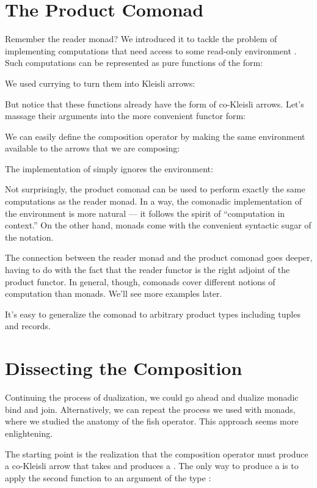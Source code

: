 \section{The Product Comonad}

Remember the reader monad? We introduced it to tackle the problem of
implementing computations that need access to some read-only environment
. Such computations can be represented as pure functions of
the form:

We used currying to turn them into Kleisli arrows:

But notice that these functions already have the form of co-Kleisli
arrows. Let's massage their arguments into the more convenient functor
form:

We can easily define the composition operator by making the same
environment available to the arrows that we are composing:

The implementation of  simply ignores the environment:

Not surprisingly, the product comonad can be used to perform exactly the
same computations as the reader monad. In a way, the comonadic
implementation of the environment is more natural --- it follows the
spirit of ``computation in context.'' On the other hand, monads come
with the convenient syntactic sugar of the  notation.

The connection between the reader monad and the product comonad goes
deeper, having to do with the fact that the reader functor is the right
adjoint of the product functor. In general, though, comonads cover
different notions of computation than monads. We'll see more examples
later.

It's easy to generalize the  comonad to arbitrary
product types including tuples and records.

\section{Dissecting the Composition}

Continuing the process of dualization, we could go ahead and dualize
monadic bind and join. Alternatively, we can repeat the process we used
with monads, where we studied the anatomy of the fish operator. This
approach seems more enlightening.

The starting point is the realization that the composition operator must
produce a co-Kleisli arrow that takes  and produces a
. The only way to produce a  is to apply the second
function to an argument of the type :

